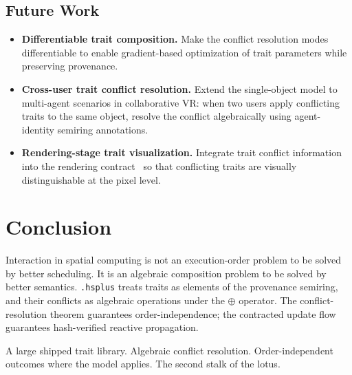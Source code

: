 \documentclass[sigconf,nonacm]{acmart}
\newcommand{\hsplus}{\texttt{.hsplus}}
\newcommand{\tropplus}{\oplus}
\begin{document}
\subsection{Future Work}
\label{sec:futurework}

\begin{itemize}
  \item \textbf{Differentiable trait composition.} Make the
    conflict resolution modes differentiable to enable
    gradient-based optimization of trait parameters while
    preserving provenance.
  \item \textbf{Cross-user trait conflict resolution.}
    Extend the single-object model to multi-agent scenarios
    in collaborative VR: when two users apply conflicting
    traits to the same object, resolve the conflict
    algebraically using agent-identity semiring annotations.
  \item \textbf{Rendering-stage trait visualization.}
    Integrate trait conflict information into the rendering
    contract~\cite{paper-13-dumbglass-siggraph2028} so that
    conflicting traits are visually distinguishable at the
    pixel level.
\end{itemize}

\section{Conclusion}
\label{sec:conclusion}

Interaction in spatial computing is not an execution-order
problem to be solved by better scheduling. It is an algebraic
composition problem to be solved by better semantics.
\hsplus{} treats traits as elements of the provenance
semiring, and their conflicts as algebraic operations under
the $\tropplus$ operator. The conflict-resolution theorem
guarantees order-independence; the contracted update flow
guarantees hash-verified reactive propagation.

A large shipped trait library. Algebraic conflict resolution.
Order-independent outcomes where the model applies. The second stalk of the lotus.



\end{document}

